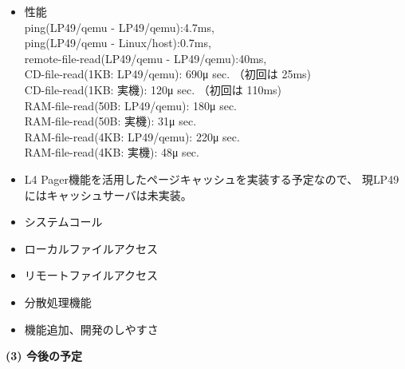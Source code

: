 \documentclass{jarticle}
\begin{document}
\begin{itemize}
\item 性能 \\
  ping(LP49/qemu - LP49/qemu):4.7ms,  \\
  ping(LP49/qemu - Linux/host):0.7ms, \\

  remote-file-read(LP49/qemu - LP49/qemu):40ms, \\

  CD-file-read(1KB: LP49/qemu): 690μ sec. （初回は 25ms)\\
  CD-file-read(1KB: 実機): 120μ sec. （初回は 110ms)\\

  RAM-file-read(50B: LP49/qemu): 180μ sec. \\
  RAM-file-read(50B: 実機):   31μ sec. \\

  RAM-file-read(4KB: LP49/qemu): 220μ sec. \\
  RAM-file-read(4KB: 実機): 48μ sec. \\

\item L4 Pager機能を活用したページキャッシュを実装する予定なので、
現LP49にはキャッシュサーバは未実装。

\item システムコール

\item  ローカルファイルアクセス

\item リモートファイルアクセス

\item 分散処理機能

\item 機能追加、開発のしやすさ
\end{itemize}

{\bf (3) 今後の予定}
\end{document}
